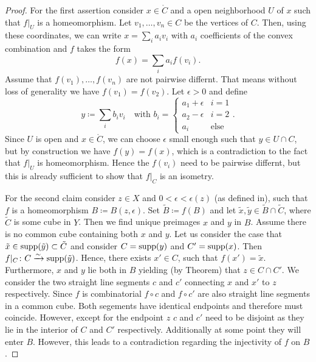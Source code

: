 \begin{proof}
  For the first assertion consider \(x \in \mathring{C}\) and a open neighborhood \(U\) of \(x\) such that \(f|_U\) is a homeomorphism. Let \(v_1, \dots, v_n \in C\) be the vertices of \(C\). Then, using these coordinates, we can write \(x = \sum_i a_i v_i\) with \(a_i\) coefficients of the convex combination and \(f\) takes the form
  \[
    f(x) = \sum_i a_i f(v_i).
  \]
  Assume that \(f(v_1), \dots, f(v_n)\) are not pairwise differnt. That means without loss of generality we have \(f(v_1) = f(v_2)\). Let \(\epsilon > 0\) and define
  \[
    y \coloneqq \sum_i b_i v_i \quad \text{with } b_i = \begin{cases}a_1 + \epsilon & i = 1\\a_2 - \epsilon & i = 2\\ a_i & \text{else}\end{cases}.
  \]
  Since \(U\) is open and \(x \in \mathring{C}\), we can choose \(\epsilon\) small enough such that \(y \in U \cap C\), but by construction we have \(f(y) = f(x)\), which is a contradiction to the fact that \(f|_U\) is homeomorphism. Hence the \(f(v_i)\) need to be pairwise differnt, but this is already sufficient to show that \(f|_C\) is an isometry.

  For the second claim consider \(z \in X\) and \(0 < \epsilon < \epsilon(z)\) (as defined in), such that \(f\) is a homeomorphism \(B \coloneqq B(z, \epsilon)\). Set \(\tilde B \coloneqq f(B)\) and let \(\tilde x, \tilde y \in \tilde B \cap \tilde C\), where \(\tilde C\) is some cube in \(Y\). Then we find unique preimages \(x\) and \(y\) in \(B\).
  Assume there is no common cube containing both \(x\) and \(y\).
  Let us consider the case that \(\tilde x \in \operatorname{supp}(\tilde y) \subset \tilde C\) and consider \(C = \operatorname{supp}(y)\) and \(C' = \operatorname{supp}(x)\). Then \(f|_C\colon C \xrightarrow{\sim} \operatorname{supp}(\tilde y)\). Hence, there exists \(x' \in C\), such that \(f(x') = \tilde x\). Furthermore, \(x\) and \(y\) lie both in \(B\) yielding (by Theorem) that \(z \in C \cap C'\). We consider the two straight line segments \(c\) and \(c'\) connecting \(x\) and \(x'\) to \(z\) respectively. Since \(f\) is combinatorial \(f \circ c\) and \(f \circ c'\) are also straight line segments in a common cube. Both segements have identical endpoints and therefore must coincide. However, except for the endpoint \(z\) \(c\) and \(c'\) need to be disjoint as they lie in the interior of \(C\) and \(C'\) respectively. Additionally at some point they will enter \(B\). However, this leads to a contradiction regarding the injectivity of \(f\) on \(B\).


\end{proof}
